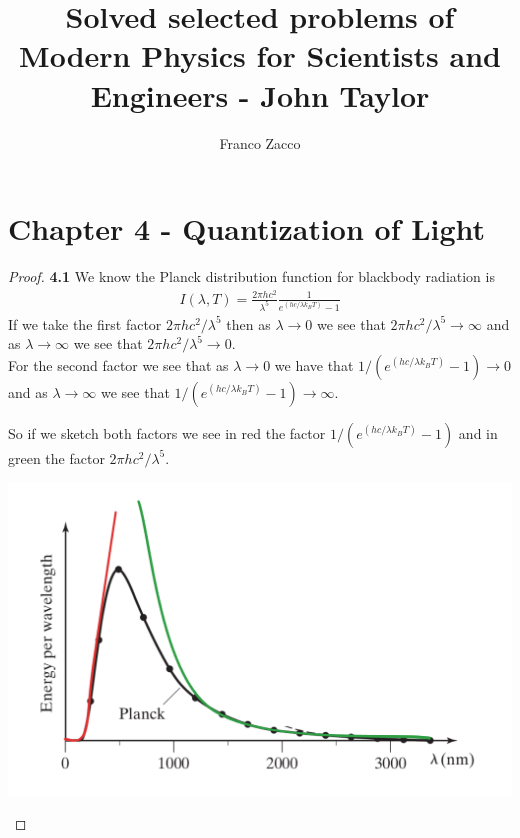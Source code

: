 \documentclass[11pt]{article}
\title{\textbf{Solved selected problems of Modern Physics for Scientists and Engineers - John Taylor}}
\author{Franco Zacco}
\date{}
\theoremstyle{definition}
\begin{document}
\maketitle
\thispagestyle{empty}

\section*{Chapter 4 - Quantization of Light}

\begin{proof}{\textbf{4.1}}
    We know the Planck distribution function for blackbody radiation is
    \begin{align*}
        I(\lambda, T)
        = \frac{2\pi hc^2}{\lambda^5}\frac{1}{e^{(hc/\lambda k_B T)} -1}
    \end{align*}
    If we take the first factor $2\pi hc^2/\lambda^5$ then as $\lambda \to 0$
    we see that $2\pi hc^2/\lambda^5 \to \infty$ and as $\lambda \to \infty$
    we see that $2\pi hc^2/\lambda^5 \to 0$.\\
    For the second factor we see that as $\lambda \to 0$ we have that
    $1/(e^{(hc/\lambda k_B T)} - 1) \to 0$ and as $\lambda \to \infty$
    we see that $1/(e^{(hc/\lambda k_B T)} - 1) \to \infty$.

    So if we sketch both factors we see in red the factor 
    $1/(e^{(hc/\lambda k_B T)} - 1)$ and in green the factor
    $2\pi hc^2/\lambda^5$.
    \begin{center}
        \includegraphics[scale=0.45]{ch4-1.png}
    \end{center}
\end{proof}
\cleardoublepage
\end{document}
